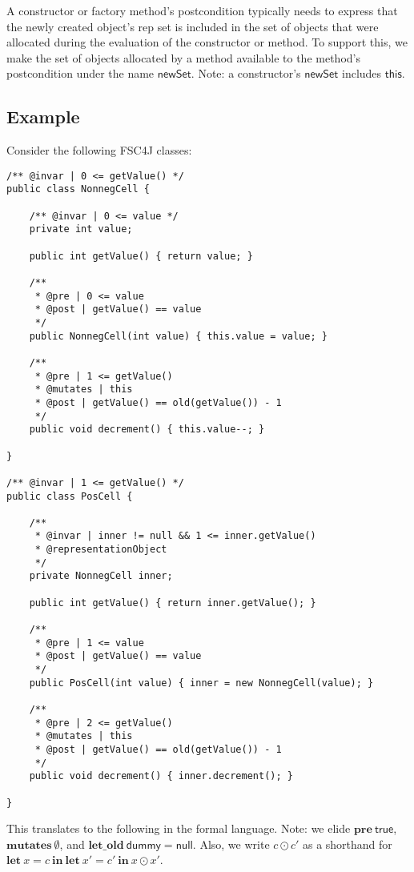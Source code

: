 \documentclass{article}
\begin{document}
A constructor or factory method's postcondition typically needs to express that the newly created object's rep set is included in the set of objects that were allocated during the evaluation of the constructor or method. To support this, we make the set of objects allocated by a method available to the method's postcondition under the name $\mathsf{newSet}$. Note: a constructor's $\mathsf{newSet}$ includes $\mathsf{this}$.

\subsection{Example}

Consider the following FSC4J classes:

\begin{verbatim}
/** @invar | 0 <= getValue() */
public class NonnegCell {

    /** @invar | 0 <= value */
    private int value;
    
    public int getValue() { return value; }
    
    /**
     * @pre | 0 <= value
     * @post | getValue() == value
     */
    public NonnegCell(int value) { this.value = value; }
    
    /**
     * @pre | 1 <= getValue()
     * @mutates | this
     * @post | getValue() == old(getValue()) - 1
     */
    public void decrement() { this.value--; }

}

/** @invar | 1 <= getValue() */
public class PosCell {
    
    /**
     * @invar | inner != null && 1 <= inner.getValue()
     * @representationObject
     */
    private NonnegCell inner;
    
    public int getValue() { return inner.getValue(); }
    
    /**
     * @pre | 1 <= value
     * @post | getValue() == value
     */
    public PosCell(int value) { inner = new NonnegCell(value); }
    
    /**
     * @pre | 2 <= getValue()
     * @mutates | this
     * @post | getValue() == old(getValue()) - 1
     */
    public void decrement() { inner.decrement(); }
    
}
\end{verbatim}

This translates to the following in the formal language. Note: we elide $\mathbf{pre}\ \mathsf{true}$, $\mathbf{mutates}\ \emptyset$, and $\mathbf{let\_old}\ \mathsf{dummy} = \mathsf{null}$. Also, we write $c \odot c'$ as a shorthand for $\mathbf{let}\ x = c\ \mathbf{in}\ \mathbf{let}\ x' = c'\ \mathbf{in}\ x \odot x'$.
\end{document}
